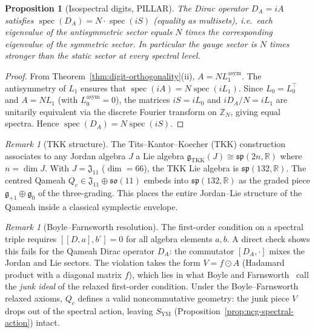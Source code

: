 \documentclass[aps,prd,twocolumn,superscriptaddress,floatfix,nofootinbib]{revtex4-2}
\newtheorem{proposition}[theorem]{Proposition}
\theoremstyle{definition}
\theoremstyle{remark}
\newtheorem{remark}[theorem]{Remark}
\begin{document}
\begin{proposition}[Isospectral digits, PILLAR]
\label{prop:isospectral-digits}
The Dirac operator $D_A = iA$ satisfies
$\operatorname{spec}(D_A) = N \cdot \operatorname{spec}(iS)$
(equality as multisets), i.e.\ each eigenvalue of the antisymmetric
sector equals $N$ times the corresponding eigenvalue of the symmetric
sector.  In particular the gauge sector is $N$ times stronger than
the static sector at every spectral level.
\end{proposition}

\begin{proof}
From Theorem~\ref{thm:digit-orthogonality}(ii), $A = N L_1^{\mathrm{asym}}$.
The antisymmetry of $L_1$ ensures that $\operatorname{spec}(iA)
= N\operatorname{spec}(iL_1)$.
Since $L_0 = L_0^\top$ and $A = N L_1$ (with $L_0^{\mathrm{asym}}=0$),
the matrices $iS = iL_0$ and $iD_A/N = iL_1$ are unitarily
equivalent via the discrete Fourier transform on $\mathbb{Z}_N$,
giving equal spectra.  Hence $\operatorname{spec}(D_A)
= N\operatorname{spec}(iS)$.
\end{proof}

\begin{remark}[TKK structure]
\label{rem:tkk}
The Tits--Kantor--Koecher (TKK) construction~\cite{tits1962,kantor1964}
associates to any Jordan algebra $J$ a Lie algebra
$\mathfrak{g}_{\mathrm{TKK}}(J) \cong \mathfrak{sp}(2n,\mathbb{R})$
where $n = \dim J$.  With $J = \mathfrak{J}_{11}$ ($\dim = 66$),
the TKK Lie algebra is $\mathfrak{sp}(132,\mathbb{R})$.
The centred Qameah $Q_c \in \mathfrak{J}_{11} \oplus \mathfrak{so}(11)$
embeds into $\mathfrak{sp}(132,\mathbb{R})$ as the graded piece
$\mathfrak{g}_{+1} \oplus \mathfrak{g}_0$ of the three-grading.
This places the entire Jordan--Lie structure of the Qameah inside
a classical symplectic envelope.
\end{remark}

\begin{remark}[Boyle--Farnsworth resolution]
\label{rem:boyle-farnsworth}
The first-order condition on a spectral triple requires
$[[D,a],b^\circ] = 0$ for all algebra elements $a,b$.
A direct check shows this fails for the Qameah Dirac operator
$D_A$: the commutator $[D_A, \cdot]$ mixes the Jordan and
Lie sectors.  The violation takes the form
$V = f \odot A$ (Hadamard product with a diagonal matrix $f$),
which lies in what Boyle and Farnsworth~\cite{boylefarnsworth2014}
call the \emph{junk ideal} of the relaxed first-order condition.
Under the Boyle--Farnsworth relaxed axioms, $Q_c$ defines a
valid noncommutative geometry: the junk piece $V$ drops out
of the spectral action, leaving $S_{\mathrm{YM}}$
(Proposition~\ref{prop:ncg-spectral-action}) intact.
\end{remark}
\end{document}
